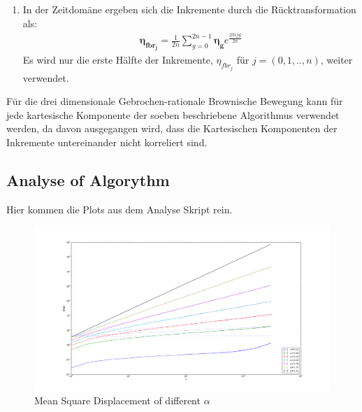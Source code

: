 \documentclass[
  a4paper,BCOR10mm,oneside,
  bibtotoc,idxtotoc,
  headsepline,footsepline,%
  fleqn,openbib
]{scrbook}
\begin{document}
\begin{enumerate}
 \item In der Zeitdomäne ergeben sich die Inkremente durch die Rücktransformation als:
 \begin{align}
 \boldsymbol{\eta_{fbr_j}}= \frac{1}{2n} \sum_{g=0}^{2n-1} \boldsymbol{\eta_g} e^{\frac{2 \pi i j g }{2n}}
 \end{align}
Es wird nur die erste Hälfte der Inkremente, $\eta_{fbr_j}$ für $j=(0,1,..,n)$, weiter verwendet.
\end{enumerate}
Für die drei dimensionale Gebrochen-rationale Brownische Bewegung kann für jede kartesische Komponente der soeben beschriebene Algorithmus verwendet werden, da davon ausgegangen wird, dass die Kartesischen Komponenten der Inkremente untereinander nicht korreliert sind. 
\subsection{Analyse of Algorythm}
Hier kommen die Plots  aus dem Analyse Skript rein.

\begin{figure}[h]
\includegraphics[width=\textwidth]{./msd_ensemble_alpha.pdf}
\caption{Mean Square Displacement of different $\alpha$}
 \centering
\end{figure}
\end{document}

